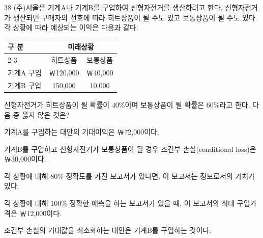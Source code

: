 \begin{question}{38}
(주)서울은 기계A나 기계B를 구입하여 신형자전거를 생산하려고 한다. 신형자전거가 생산되면 구매자의 선호에 따라 히트상품이 될 수도 있고 보통상품이 될 수도 있다. 각 상황에 따라 예상되는 이익은 다음과 같다.

{\small\centering
\begin{tabular}{|l|c|c|}
\hline
\multirow{2}{*}{구 분} & \multicolumn{2}{c|}{미래상황} \\
\cline{2-3}
 & 히트상품 & 보통상품 \\
\hline
기계A 구입 & ￦120,000 & ￦40,000 \\
기계B 구입 & 150,000 & 10,000 \\
\hline
\end{tabular}\par}

신형자전거가 히트상품이 될 확률이 40\%이며 보통상품이 될 확률은 60\%라고 한다. 다음 중 옳지 않은 것은? \par
\begin{choices}
  \item 기계A를 구입하는 대안의 기대이익은 ￦72,000이다.
  \item 기계B를 구입하고 신형자전거가 보통상품이 될 경우 조건부 손실(conditional loss)은 ￦30,000이다.
  \item 각 상황에 대해 80\% 정확도를 가진 보고서가 있다면, 이 보고서는 정보로서의 가치가 있다.
  \item 각 상황에 대해 100\% 정확한 예측을 하는 보고서가 있을 때, 이 보고서의 최대 구입가격은 ￦12,000이다.
  \item 조건부 손실의 기대값을 최소화하는 대안은 기계B를 구입하는 것이다.
\end{choices}
\end{question}
